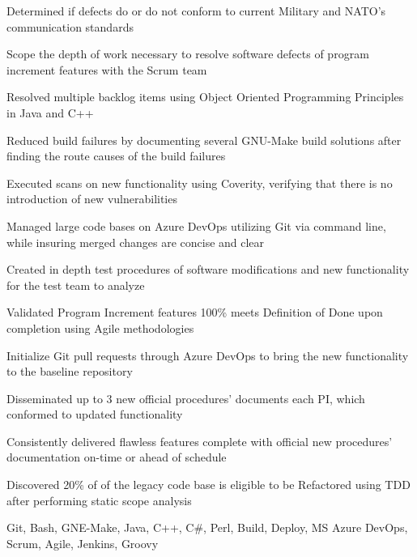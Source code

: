 \begin{experiences}
{\begin{description}[font=$\bullet$\scshape\bfseries]
            \item Determined if defects do or do not conform to current Military and NATO's communication standards
            \item Scope the depth of work necessary to resolve software defects of program increment features with the Scrum team
            \item Resolved multiple backlog items using Object Oriented Programming Principles in Java and C++
            \item Reduced build failures by documenting several GNU-Make build solutions after finding the route causes of the build failures
            \item Executed scans on new functionality using Coverity, verifying that there is no introduction of new vulnerabilities
            \item Managed large code bases on Azure DevOps utilizing Git via command line, while insuring merged changes are concise and clear
            \item Created in depth test procedures of software modifications and new functionality for the test team to analyze
            \item Validated Program Increment features 100\% meets Definition of Done upon completion using Agile methodologies
            \item Initialize Git pull requests through Azure DevOps to bring the new functionality to the baseline repository
            \item Disseminated up to 3 new official procedures' documents each PI, which conformed to updated functionality
            \item Consistently delivered flawless features complete with official new procedures' documentation on-time or ahead of schedule
            \item Discovered 20\% of of the legacy code base is eligible to be Refactored using TDD after performing  static scope analysis 
      \end{description}
        }
        {Git, Bash, GNE-Make, Java, C++, C\#, Perl, Build, Deploy, MS Azure DevOps, Scrum, Agile, Jenkins, Groovy}
  \emptySeparator
  

\end{experiences}
